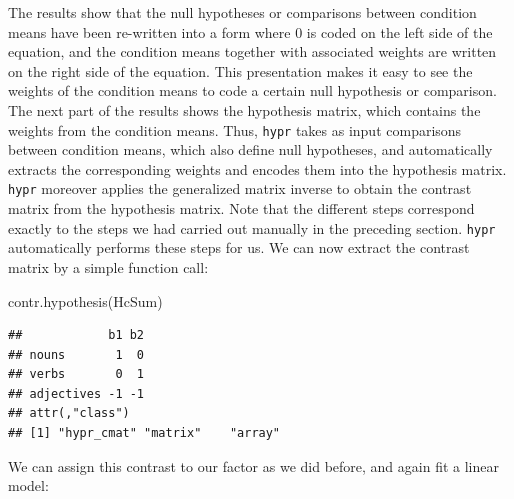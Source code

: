 \documentclass[
  12pt,
]{krantz}
\newenvironment{Shaded}{\begin{snugshade}}{\end{snugshade}}
\newcommand{\AttributeTok}[1]{\textcolor[rgb]{0.77,0.63,0.00}{#1}}
\newcommand{\DecValTok}[1]{\textcolor[rgb]{0.00,0.00,0.81}{#1}}
\newcommand{\FunctionTok}[1]{\textcolor[rgb]{0.00,0.00,0.00}{#1}}
\newcommand{\NormalTok}[1]{#1}
\newcommand{\OtherTok}[1]{\textcolor[rgb]{0.56,0.35,0.01}{#1}}
\newcommand{\SpecialCharTok}[1]{\textcolor[rgb]{0.00,0.00,0.00}{#1}}
\newcommand{\StringTok}[1]{\textcolor[rgb]{0.31,0.60,0.02}{#1}}
\theoremstyle{definition}
\theoremstyle{definition}
\theoremstyle{definition}
\theoremstyle{definition}
\theoremstyle{remark}
\begin{document}
The results show that the null hypotheses or comparisons between condition means have been re-written into a form where \(0\) is coded on the left side of the equation, and the condition means together with associated weights are written on the right side of the equation. This presentation makes it easy to see the weights of the condition means to code a certain null hypothesis or comparison. The next part of the results shows the hypothesis matrix, which contains the weights from the condition means. Thus, \texttt{hypr} takes as input comparisons between condition means, which also define null hypotheses, and automatically extracts the corresponding weights and encodes them into the hypothesis matrix. \texttt{hypr} moreover applies the generalized matrix inverse to obtain the contrast matrix from the hypothesis matrix. Note that the different steps correspond exactly to the steps we had carried out manually in the preceding section. \texttt{hypr} automatically performs these steps for us. We can now extract the contrast matrix by a simple function call:

\begin{Shaded}
\begin{Highlighting}[]
\FunctionTok{contr.hypothesis}\NormalTok{(HcSum)}
\end{Highlighting}
\end{Shaded}

\begin{verbatim}
##            b1 b2
## nouns       1  0
## verbs       0  1
## adjectives -1 -1
## attr(,"class")
## [1] "hypr_cmat" "matrix"    "array"
\end{verbatim}

We can assign this contrast to our factor as we did before, and again fit a linear model:

\begin{Shaded}
\end{Shaded}
\end{document}
